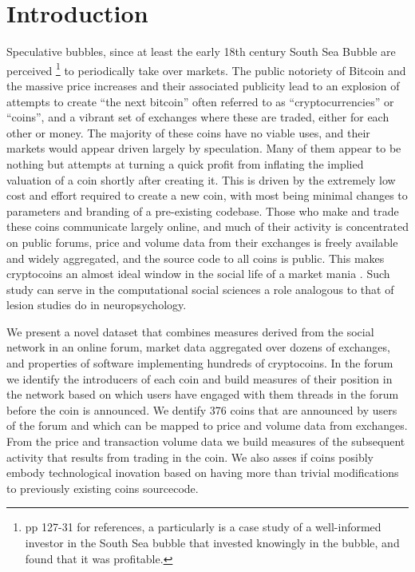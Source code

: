\section{Introduction}

Speculative bubbles, since at least the early 18th century South Sea Bubble are perceived \footnote{\cite{garber2001famous} pp 127-31 for references, a particularly is \cite{temin2004riding} a case study of a well-informed investor in the South Sea bubble that invested knowingly in the bubble, and found that it was profitable. } to periodically take over markets. %
The public notoriety of Bitcoin and the massive price increases and their associated publicity  lead to an explosion of attempts to create ``the next bitcoin'' often referred to as ``cryptocurrencies'' or ``coins'', and a vibrant set of exchanges where these are traded, either for each other or money.
The majority of these coins have no viable uses, and their markets would appear driven largely by speculation.
Many of them appear to be nothing but attempts at turning a quick profit from inflating the implied valuation of a coin shortly after creating it.
This is driven by the extremely low cost and effort required to create a new coin, with most being minimal changes to parameters and branding of a pre-existing codebase.
Those who make and trade these coins communicate largely online, and much of their activity is concentrated on public forums, price and volume data from their exchanges is freely available and widely aggregated, and the source code to all coins is public.
This makes cryptocoins an almost ideal window in the social life of a market mania \cite{cosma2008}.
Such study can serve in the computational social sciences a role analogous to that of lesion studies do in neuropsychology.



We present a novel dataset that combines measures derived from the social network in an online forum, market data aggregated over dozens of exchanges, and properties of software implementing hundreds of cryptocoins.
In the forum we identify the introducers of each coin and build measures of their position in the network based on which users have engaged with them threads in the forum before the coin is announced.
We dentify 376 coins that are announced by users of the forum and which can be mapped to price and volume data from exchanges.
From the price and transaction volume data we build measures of the subsequent activity that results from trading in the coin. 
We also asses if coins posibly embody technological inovation based on having more than trivial modifications to previously existing coins sourcecode.

